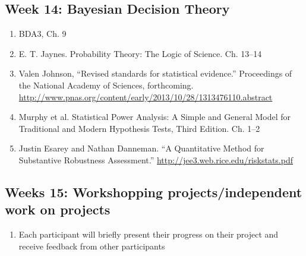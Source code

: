 \documentclass[11pt, leqno, fleqn]{article}
\begin{document}
\subsection*{Week 14: Bayesian Decision Theory}
	\begin{enumerate}
	\item[] BDA3, Ch. 9
	\item[] E. T. Jaynes. Probability Theory: The Logic of Science. Ch. 13--14
	\item[] Valen Johnson, ``Revised standards for statistical evidence.'' Proceedings of the National Academy of Sciences, forthcoming. \url{http://www.pnas.org/content/early/2013/10/28/1313476110.abstract}
	\item[] Murphy et al. Statistical Power Analysis: A Simple and General Model for Traditional and Modern Hypothesis Tests, Third Edition. Ch. 1--2
	\item[] Justin Esarey and Nathan Danneman. ``A Quantitative Method for Substantive Robustness Assessment.'' \url{http://jee3.web.rice.edu/riskstats.pdf}
	\end{enumerate}
\subsection*{Weeks 15: Workshopping projects/independent work on projects}
	\begin{enumerate}
	\item[] Each participant will briefly present their progress on their project and receive feedback from other participants
	\end{enumerate}
\end{document}
